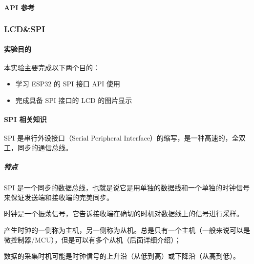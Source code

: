 \documentclass[a4paper,12pt,english]{sphinxmanual}
\begin{document}
{{\paragraph{API 参考}
\label{\detokenize{exp-esp32/peripherals/uart:api}}
\sphinxAtStartPar
{}

\sphinxstepscope


\subsubsection{LCD\&SPI}
\label{\detokenize{exp-esp32/peripherals/lcd_spi:lcd-spi}}\label{\detokenize{exp-esp32/peripherals/lcd_spi::doc}}

\paragraph{实验目的}
\label{\detokenize{exp-esp32/peripherals/lcd_spi:id1}}
\sphinxAtStartPar
本实验主要完成以下两个目的：
\begin{itemize}
\item {} 
\sphinxAtStartPar
学习 ESP32 的 SPI 接口 API 使用

\item {} 
\sphinxAtStartPar
完成具备 SPI 接口的 LCD 的图片显示

\end{itemize}


\paragraph{SPI 相关知识}
\label{\detokenize{exp-esp32/peripherals/lcd_spi:spi}}
\sphinxAtStartPar
SPI 是串行外设接口（Serial Peripheral Interface）的缩写，是一种高速的，全双工，同步的通信总线。


\subparagraph{特点}
\label{\detokenize{exp-esp32/peripherals/lcd_spi:id2}}
\sphinxAtStartPar
SPI 是一个同步的数据总线，也就是说它是用单独的数据线和一个单独的时钟信号来保证发送端和接收端的完美同步。

\sphinxAtStartPar
时钟是一个振荡信号，它告诉接收端在确切的时机对数据线上的信号进行采样。

\sphinxAtStartPar
产生时钟的一侧称为主机，另一侧称为从机。总是只有一个主机（一般来说可以是微控制器/MCU），但是可以有多个从机（后面详细介绍）；

\sphinxAtStartPar
数据的采集时机可能是时钟信号的上升沿（从低到高）或下降沿（从高到低）。

}}
\end{document}
